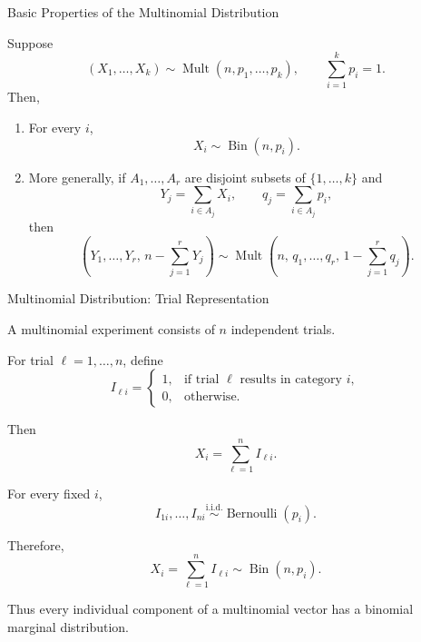\begin{frame}{Basic Properties of the Multinomial Distribution}

\begin{theorem}
Suppose
\[
(X_1,\dots,X_k)
\sim
\operatorname{Mult}(n,p_1,\dots,p_k),
\qquad
\sum_{i=1}^k p_i=1.
\]
Then,
\begin{enumerate}
    \item For every $i$,
    \[
    X_i\sim \operatorname{Bin}(n,p_i).
    \]

    \item More generally, if $A_1,\dots,A_r$ are disjoint subsets of $\{1,\dots,k\}$ and
    \[
    Y_j=\sum_{i\in A_j}X_i,
    \qquad
    q_j=\sum_{i\in A_j}p_i,
    \]
    then
    \[
    \left(
    Y_1,\dots,Y_r,\,
    n-\sum_{j=1}^rY_j
    \right)
    \sim
    \operatorname{Mult}
    \left(
    n,\,
    q_1,\dots,q_r,\,
    1-\sum_{j=1}^rq_j
    \right).
    \]
\end{enumerate}

\end{theorem}

\end{frame}

\begin{frame}{Multinomial Distribution: Trial Representation}

A multinomial experiment consists of $n$ independent trials.

For trial $\ell=1,\dots,n$, define
\[
I_{\ell i}
=
\begin{cases}
1, & \text{if trial $\ell$ results in category $i$},\\
0, & \text{otherwise}.
\end{cases}
\]

Then
\[
X_i=\sum_{\ell=1}^n I_{\ell i}.
\]

For every fixed $i$,
\[
I_{1i},\dots,I_{ni}
\overset{\text{i.i.d.}}{\sim}
\operatorname{Bernoulli}(p_i).
\]

Therefore,
\[
X_i
=
\sum_{\ell=1}^n I_{\ell i}
\sim
\operatorname{Bin}(n,p_i).
\]

Thus every individual component of a multinomial vector has a
binomial marginal distribution.

\end{frame}

